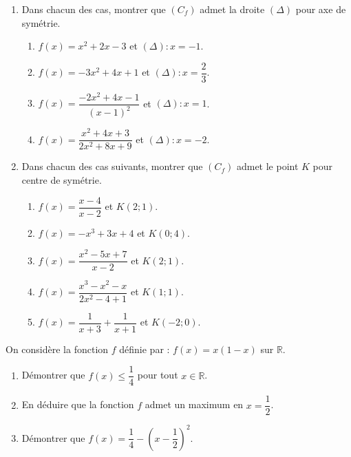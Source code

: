 \documentclass{article}
\begin{document}
\begin{enumerate}
    \item  Dans chacun des cas, montrer que \( (C_f) \) admet la droite \( (\Delta) \) pour axe de symétrie.

\begin{enumerate}
    \item \( f(x) = x^2 + 2x - 3 \) et \( (\Delta) : x = -1 \).
    \item \( f(x) = -3x^2 + 4x + 1 \) et \( (\Delta) : x = \dfrac{2}{3} \).
    \item \( f(x) = \dfrac{-2x^2 + 4x - 1}{(x - 1)^2} \) et \( (\Delta) : x = 1 \).
    \item \( f(x) = \dfrac{x^2 + 4x + 3}{2x^2 + 8x + 9} \) et \( (\Delta) : x = -2 \).
\end{enumerate}

\item  Dans chacun des cas suivants, montrer que \( (C_f) \) admet le point \( K \) pour centre de symétrie.

\begin{enumerate}
    \item \( f(x) = \dfrac{x - 4}{x - 2} \) et \( K(2;1) \).
    \item \( f(x) = -x^3 + 3x + 4 \) et \( K(0;4) \).
    \item \( f(x) = \dfrac{x^2 - 5x + 7}{x - 2} \) et \( K(2;1) \).
    \item \( f(x) = \dfrac{x^3 - x^2 - x}{2x^2 - 4 + 1} \) et \( K(1;1) \).
    \item \( f(x) = \dfrac{1}{x+3} + \dfrac{1}{x+1} \) et \( K(-2;0) \).
\end{enumerate}

\end{enumerate}


\bigskip

On considère la fonction \( f \) définie par :  
\( f(x) = x(1 - x) \) sur \( \mathbb{R} \).

\begin{enumerate}
    \item Démontrer que \( f(x) \leq \dfrac{1}{4} \) pour tout \( x \in \mathbb{R} \).
    \item En déduire que la fonction \( f \) admet un maximum en \( x = \dfrac{1}{2} \).
    \item Démontrer que \( f(x) = \dfrac{1}{4} - \left( x - \dfrac{1}{2} \right)^2 \).
\end{enumerate}
\end{document}
